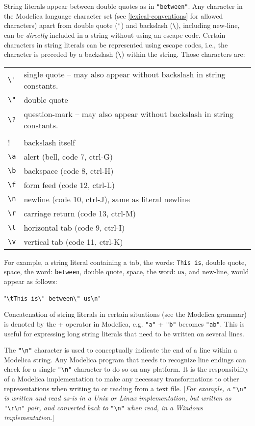 String literals appear between double quotes as in \lstinline!"between"!. Any
character in the Modelica language character set (see \autoref{lexical-conventions} for
allowed characters) apart from double quote (\lstinline!"!) and backslash
(\lstinline!\!), including new-line, can be \emph{directly} included
in a string without using an escape code. Certain characters in string
literals can be represented using escape codes, i.e., the character is
preceded by a backslash (\lstinline!\!) within the string. Those
characters are:

\begin{longtable}[c]{@{}ll@{}}
\lstinline!\'! & single quote -- may also appear without backslash in string constants.\\
\lstinline!\"! & double quote\\
\lstinline!\?! & question-mark -- may also appear without backslash in string constants.\\
\lstinline!\\! & backslash itself\\
\lstinline!\a! & alert (bell, code 7, ctrl-G)\\
\lstinline!\b! & backspace (code 8, ctrl-H)\\
\lstinline!\f! & form feed (code 12, ctrl-L)\\
\lstinline!\n! & newline (code 10, ctrl-J), same as literal newline\\
\lstinline!\r! & carriage return (code 13, ctrl-M)\\
\lstinline!\t! & horizontal tab (code 9, ctrl-I)\\
\lstinline!\v! & vertical tab (code 11, ctrl-K)\\
\end{longtable}

For example, a string literal containing a tab, the words: \lstinline!This is!,
double quote, space, the word: \lstinline!between!, double quote, space, the word:
\lstinline!us!, and new-line, would appear as follows:

"\lstinline!\tThis is\" between\" us\n!"

Concatenation of string literals in certain situations (see the Modelica
grammar) is denoted by the + operator in Modelica, e.g. \lstinline!"a"! + \lstinline!"b"!
becomes \lstinline!"ab"!. This is useful for expressing long string literals that
need to be written on several lines.

The \lstinline!"\n"! character is used to conceptually indicate the
end of a line within a Modelica string. Any Modelica program that needs
to recognize line endings can check for a single
\lstinline!"\n"!
character to do so on any platform. It is the responsibility of a
Modelica implementation to make any necessary transformations to other
representations when writing to or reading from a text file.
{[}\emph{For example, a} \lstinline!"\n"! \emph{is written and read as-is in
a Unix or Linux implementation, but written as}
\lstinline!"\r\n"! \emph{pair, and converted back to}
\lstinline!"\n"! \emph{when read, in a Windows implementation.}{]}


